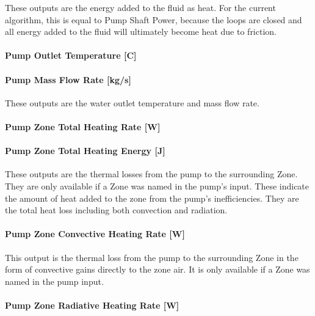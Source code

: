 These outputs are the energy added to the fluid as heat. For the current algorithm, this is equal to Pump Shaft Power, because the loops are closed and all energy added to the fluid will ultimately become heat due to friction.

\paragraph{Pump Outlet Temperature {[}C{]}}\label{pump-outlet-temperature-c-2}

\paragraph{Pump Mass Flow Rate {[}kg/s{]}}\label{pump-mass-flow-rate-kgs-2}

These outputs are the water outlet temperature and mass flow rate.

\paragraph{Pump Zone Total Heating Rate {[}W{]}}\label{pump-zone-total-heating-rate-w-2}

\paragraph{Pump Zone Total Heating Energy {[}J{]}}\label{pump-zone-total-heating-energy-j-2}

These outputs are the thermal losses from the pump to the surrounding Zone. They are only available if a Zone was named in the pump's input. These indicate the amount of heat added to the zone from the pump's inefficiencies. They are the total heat loss including both convection and radiation.

\paragraph{Pump Zone Convective Heating Rate {[}W{]}}\label{pump-zone-convective-heating-rate-w-2}

This output is the thermal loss from the pump to the surrounding Zone in the form of convective gains directly to the zone air. It is only available if a Zone was named in the pump input.

\paragraph{Pump Zone Radiative Heating Rate {[}W{]}}\label{pump-zone-radiative-heating-rate-w-2}

